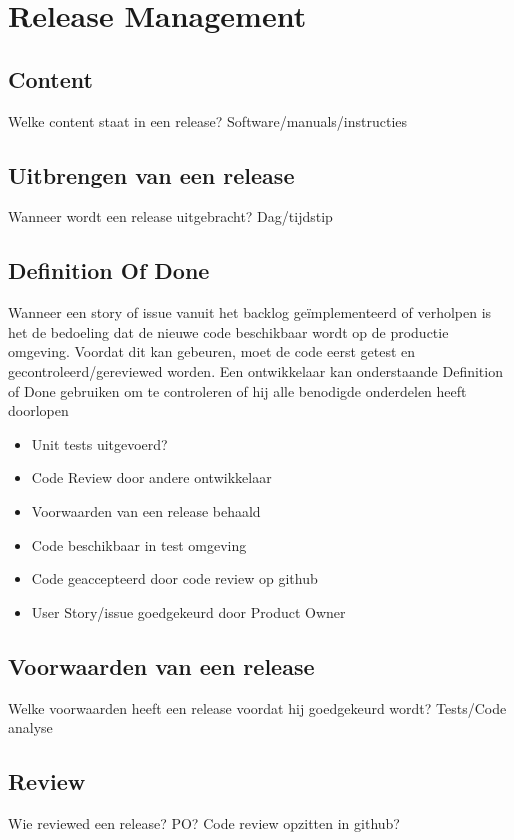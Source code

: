 \chapter{Release Management}

\section{Content}
Welke content staat in een release? Software/manuals/instructies

\section{Uitbrengen van een release}
Wanneer wordt een release uitgebracht? Dag/tijdstip

\section{Definition Of Done}
Wanneer een story of issue vanuit het backlog geïmplementeerd of verholpen is het de bedoeling dat de nieuwe code beschikbaar wordt op de productie omgeving. Voordat dit kan gebeuren, moet de code eerst getest en gecontroleerd/gereviewed worden. Een ontwikkelaar kan onderstaande Definition of Done gebruiken om te controleren of hij alle benodigde onderdelen heeft doorlopen
	
	\begin{itemize}
			\item Unit tests uitgevoerd?
			\item Code Review door andere ontwikkelaar
			\item Voorwaarden van een release behaald
			\item Code beschikbaar in test omgeving
			\item Code geaccepteerd door code review op github
			\item User Story/issue goedgekeurd door Product Owner		
	\end{itemize}

\section{Voorwaarden van een release}
Welke voorwaarden heeft een release voordat hij goedgekeurd wordt? Tests/Code analyse

\section{Review}
Wie reviewed een release? PO? Code review opzitten in github?

